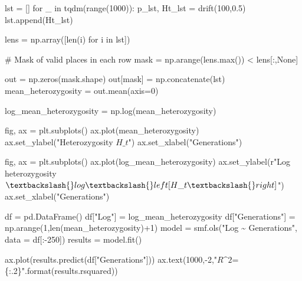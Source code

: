 \documentclass[
  letterpaper,
  DIV=11,
  numbers=noendperiod]{scrartcl}
\newenvironment{Shaded}{\begin{snugshade}}{\end{snugshade}}
\newcommand{\BuiltInTok}[1]{\textcolor[rgb]{0.00,0.23,0.31}{#1}}
\newcommand{\CommentTok}[1]{\textcolor[rgb]{0.37,0.37,0.37}{#1}}
\newcommand{\ControlFlowTok}[1]{\textcolor[rgb]{0.00,0.23,0.31}{#1}}
\newcommand{\DecValTok}[1]{\textcolor[rgb]{0.68,0.00,0.00}{#1}}
\newcommand{\FloatTok}[1]{\textcolor[rgb]{0.68,0.00,0.00}{#1}}
\newcommand{\KeywordTok}[1]{\textcolor[rgb]{0.00,0.23,0.31}{#1}}
\newcommand{\NormalTok}[1]{\textcolor[rgb]{0.00,0.23,0.31}{#1}}
\newcommand{\OperatorTok}[1]{\textcolor[rgb]{0.37,0.37,0.37}{#1}}
\newcommand{\SpecialCharTok}[1]{\textcolor[rgb]{0.37,0.37,0.37}{#1}}
\newcommand{\StringTok}[1]{\textcolor[rgb]{0.13,0.47,0.30}{#1}}
\newcommand{\VariableTok}[1]{\textcolor[rgb]{0.07,0.07,0.07}{#1}}
\newcommand{\VerbatimStringTok}[1]{\textcolor[rgb]{0.13,0.47,0.30}{#1}}
\begin{document}
\begin{Shaded}
\begin{Highlighting}[]
\NormalTok{lst }\OperatorTok{=}\NormalTok{ []}
\ControlFlowTok{for}\NormalTok{ \_ }\KeywordTok{in}\NormalTok{ tqdm(}\BuiltInTok{range}\NormalTok{(}\DecValTok{1000}\NormalTok{)):}
\NormalTok{    p\_lst, Ht\_lst }\OperatorTok{=}\NormalTok{ drift(}\DecValTok{100}\NormalTok{,}\FloatTok{0.5}\NormalTok{)}
\NormalTok{    lst.append(Ht\_lst)}

\NormalTok{lens }\OperatorTok{=}\NormalTok{ np.array([}\BuiltInTok{len}\NormalTok{(i) }\ControlFlowTok{for}\NormalTok{ i }\KeywordTok{in}\NormalTok{ lst])}

\CommentTok{\# Mask of valid places in each row}
\NormalTok{mask }\OperatorTok{=}\NormalTok{ np.arange(lens.}\BuiltInTok{max}\NormalTok{()) }\OperatorTok{\textless{}}\NormalTok{ lens[:,}\VariableTok{None}\NormalTok{]}

\NormalTok{out }\OperatorTok{=}\NormalTok{ np.zeros(mask.shape)}
\NormalTok{out[mask] }\OperatorTok{=}\NormalTok{ np.concatenate(lst)}
\NormalTok{mean\_heterozygosity }\OperatorTok{=}\NormalTok{ out.mean(axis}\OperatorTok{=}\DecValTok{0}\NormalTok{)}

\NormalTok{log\_mean\_heterozygosity }\OperatorTok{=}\NormalTok{ np.log(mean\_heterozygosity)}

\NormalTok{fig, ax }\OperatorTok{=}\NormalTok{ plt.subplots()}
\NormalTok{ax.plot(mean\_heterozygosity)}
\NormalTok{ax.set\_ylabel(}\StringTok{"Heterozygosity $H\_t$"}\NormalTok{)}
\NormalTok{ax.set\_xlabel(}\StringTok{"Generations"}\NormalTok{)}

\NormalTok{fig, ax }\OperatorTok{=}\NormalTok{ plt.subplots()}
\NormalTok{ax.plot(log\_mean\_heterozygosity)}
\NormalTok{ax.set\_ylabel(}\VerbatimStringTok{r"Log heterozygosity $\textbackslash{}log\textbackslash{}left[H\_t\textbackslash{}right]$"}\NormalTok{)}
\NormalTok{ax.set\_xlabel(}\StringTok{"Generations"}\NormalTok{)}


\NormalTok{df }\OperatorTok{=}\NormalTok{ pd.DataFrame()}
\NormalTok{df[}\StringTok{"Log"}\NormalTok{] }\OperatorTok{=}\NormalTok{ log\_mean\_heterozygosity}
\NormalTok{df[}\StringTok{"Generations"}\NormalTok{] }\OperatorTok{=}\NormalTok{ np.arange(}\DecValTok{1}\NormalTok{,}\BuiltInTok{len}\NormalTok{(mean\_heterozygosity)}\OperatorTok{+}\DecValTok{1}\NormalTok{)}
\NormalTok{model }\OperatorTok{=}\NormalTok{ smf.ols(}\StringTok{"Log \textasciitilde{} Generations"}\NormalTok{, data }\OperatorTok{=}\NormalTok{ df[:}\OperatorTok{{-}}\DecValTok{250}\NormalTok{])}
\NormalTok{results }\OperatorTok{=}\NormalTok{ model.fit()}

\NormalTok{ax.plot(results.predict(df[}\StringTok{"Generations"}\NormalTok{]))}
\NormalTok{ax.text(}\DecValTok{1000}\NormalTok{,}\OperatorTok{{-}}\DecValTok{2}\NormalTok{,}\StringTok{"$R\^{}2$=}\SpecialCharTok{\{:.2\}}\StringTok{"}\NormalTok{.}\BuiltInTok{format}\NormalTok{(results.rsquared))}
\end{Highlighting}
\end{Shaded}
\end{document}
